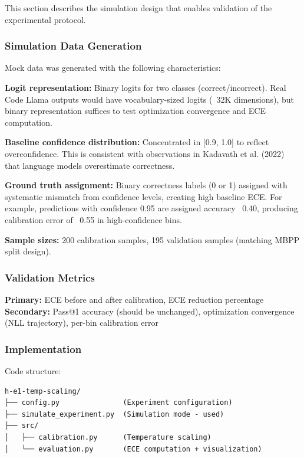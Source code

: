 
This section describes the simulation design that enables validation of the experimental protocol.

\subsubsection{Simulation Data Generation}

Mock data was generated with the following characteristics:

\textbf{Logit representation:} Binary logits for two classes (correct/incorrect). Real Code Llama outputs would have vocabulary-sized logits (~32K dimensions), but binary representation suffices to test optimization convergence and ECE computation.

\textbf{Baseline confidence distribution:} Concentrated in [0.9, 1.0] to reflect overconfidence. This is consistent with observations in Kadavath et al. (2022) that language models overestimate correctness.

\textbf{Ground truth assignment:} Binary correctness labels (0 or 1) assigned with systematic mismatch from confidence levels, creating high baseline ECE. For example, predictions with confidence 0.95 are assigned accuracy ~0.40, producing calibration error of ~0.55 in high-confidence bins.

\textbf{Sample sizes:} 200 calibration samples, 195 validation samples (matching MBPP split design).

\subsubsection{Validation Metrics}

\textbf{Primary:} ECE before and after calibration, ECE reduction percentage
\textbf{Secondary:} Pass@1 accuracy (should be unchanged), optimization convergence (NLL trajectory), per-bin calibration error

\subsubsection{Implementation}

Code structure:
\begin{verbatim}
h-e1-temp-scaling/
├── config.py               (Experiment configuration)
├── simulate_experiment.py  (Simulation mode - used)
├── src/
│   ├── calibration.py      (Temperature scaling)
│   └── evaluation.py       (ECE computation + visualization)
\end{verbatim}

